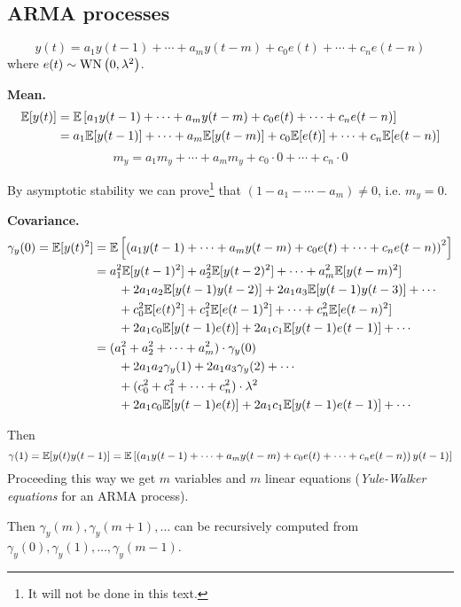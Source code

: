 \subsection{ARMA processes}
$$
y(t)=a_{1} y(t-1)+\cdots+a_{m} y(t-m)+c_{0} e(t)+\cdots+c_{n} e(t-n)
$$
where $e(t) \sim \operatorname{WN}\left(0, \lambda^{2}\right)$.

\textbf{Mean.}
\begin{align*}
	\mathbb{E}[y(t)] &=\mathbb{E}\left[a_{1} y(t-1)+\cdots+a_{m} y(t-m)+c_{0} e(t)+\cdots+c_{n} e(t-n)\right] \\
	&=a_{1} \mathbb{E}[y(t-1)]+\cdots+a_{m} \mathbb{E}[y(t-m)]+c_{0} \mathbb{E}[e(t)]+\cdots+c_{n} \mathbb{E}[e(t-n)]
\end{align*}
$$
m_{y}=a_{1} m_{y}+\cdots+a_{m} m_{y}+c_{0} \cdot 0+\cdots+c_{n} \cdot 0
$$

By asymptotic stability we can prove\footnote{It will not be done in this text.} that $(1-a_1-\cdots-a_m)\neq 0$, i.e. $m_{y}=0$.

\textbf{Covariance.}
\begin{align*}
	\gamma_{y}(0) = \mathbb{E}[y(t)^{2}] &= \mathbb{E}\left[\left(a_{1} y(t-1) + \cdots + a_{m} y(t-m) + c_{0} e(t) + \cdots + c_{n} e(t-n)\right)^{2}\right]\\
	&= a_{1}^{2} \mathbb{E}[y(t-1)^{2}] + a_{2}^{2} \mathbb{E}[y(t-2)^{2}] + \cdots+a_{m}^{2} \mathbb{E}[y(t-m)^{2}]\\
	&\qquad + 2 a_{1} a_{2} \mathbb{E}[y(t-1) y(t-2)] + 2 a_{1} a_{3} \mathbb{E}[y(t-1) y(t-3)] + \cdots \\
	&\qquad + c_{0}^{2} \mathbb{E}[e(t)^{2}] + c_{1}^2 \mathbb{E}[e(t-1)^2] + \cdots+c_{n}^2 \mathbb{E}[e(t-n)^2]\\
	&\qquad + 2 a_{1} c_{0} \mathbb{E}[y(t-1) e(t)] + 2 a_{1} c_{1} \mathbb{E}[y(t-1) e(t-1)] + \cdots\\
	&= (a_{1}^{2} + a_{2}^{2} + \cdots+a_{m}^{2})\cdot\gamma_{y}(0)\\
	&\qquad + 2 a_{1} a_{2} \gamma_{y}(1) + 2 a_{1} a_{3} \gamma_{y}(2) + \cdots \\
	&\qquad + (c_{0}^{2} + c_{1}^2 + \cdots+c_{n}^2)\cdot\lambda^2\\
	&\qquad + 2 a_{1} c_{0} \mathbb{E}[y(t-1) e(t)] + 2 a_{1} c_{1} \mathbb{E}[y(t-1) e(t-1)] + \cdots\\
\end{align*}

Then
\[
	\gamma (1)=\mathbb{E}[y(t) y(t-1)] = \mathbb{E}\left[\left(a_{1} y(t-1)+\cdots+a_{m} y(t-m)+c_{0} e(t)+\cdots+c_{n} e(t-n)\right) y(t-1)\right]
\]
Proceeding this way we get $m$ variables and $m$ linear equations (\emph{Yule-Walker equations} for an ARMA process).

Then $\gamma_{y}(m), \gamma_{y}(m+1), \ldots$ can be recursively computed from $\gamma_{y}(0), \gamma_{y}(1), \ldots, \gamma_{y}(m-1)$.